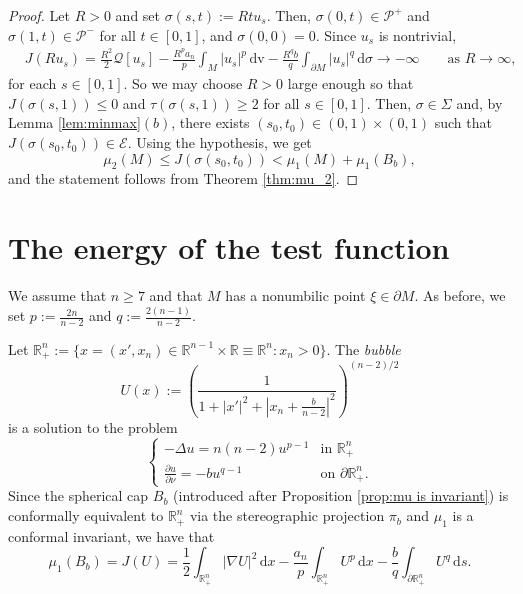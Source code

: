 \documentclass[reqno,11pt,oneside]{amsart}
\numberwithin{equation}{section}
\def\r{\mathbb{R}}
\def\rn{\mathbb{R}^n}
\def\im{\int_{M}}
\def\idm{\int_{\partial M}}
\def\cE{\mathcal{E}}
\def\cP{\mathcal{P}}
\def\d{\,\mathrm{d}}
\def\dv{\,\mathrm{dv}}
\begin{document}
\begin{proof}
Let $R>0$ and set $\sigma(s,t):=Rtu_s$. Then, $\sigma(0,t)\in\cP^+$ and $\sigma(1,t)\in\cP^-$ for all $t\in[0,1]$, and $\sigma(0,0)=0$. Since $u_s$ is nontrivial,
\begin{align*}
&J(Ru_s)=\frac{R^2}{2}\mathscr{Q}[u_s]-\frac{R^pa_n}{p}\im|u_s|^p\dv-\frac{R^qb}{q}\idm|u_s|^q\d \sigma\to-\infty\qquad\text{as \ }R\to\infty,
\end{align*}
for each $s\in[0,1]$. So we may choose $R>0$ large enough so that $J(\sigma(s,1))\leq 0$ and $\tau(\sigma(s,1))\geq 2$ for all $s\in[0,1]$. Then, $\sigma\in\Sigma$ and, by Lemma \ref{lem:minmax}$(b)$, there exists $(s_0,t_0)\in(0,1)\times(0,1)$ such that $J(\sigma(s_0,t_0))\in\cE$. Using the hypothesis, we get
$$\mu_2(M)\leq J(\sigma(s_0,t_0))< \mu_1(M)+\mu_1(B_b),$$
and the statement follows from Theorem \ref{thm:mu_2}.
\end{proof}



\section{The energy of the test function}
\label{sec:test function}

We assume that $n\geq 7$ and that $M$ has a nonumbilic point $\xi\in\partial M$. As before, we set $p:=\frac{2n}{n-2}$ and $q:=\frac{2(n-1)}{n-2}$.

Let $\rn_+:=\{x=(x',x_n)\in\r^{n-1}\times\r\equiv\rn:x_n>0\}$. The \emph{bubble} 
$$U(x):=\left(\frac{1}{1+|x'|^2+|x_n+\frac{b}{n-2}|^2}\right)^{(n-2)/2}$$
is a solution to the problem
\begin{equation*}
\begin{cases}
-\Delta u = n(n-2)u^{p-1}&\text{in \ }\rn_+ \\
\frac{\partial u}{\partial\nu}=-bu^{q-1} &\text{on \ }\partial\rn_+.
\end{cases}
\end{equation*}
Since the spherical cap $B_b$ (introduced after Proposition \ref{prop:mu is invariant}) is conformally equivalent to $\rn_+$ via the stereographic projection $\pi_b$ and $\mu_1$ is a conformal invariant, we have that
$$\mu_1(B_b)=J(U)=\frac{1}{2}\int_{\rn_+}|\nabla U|^2\d x -\frac{a_n}{p}\int_{\rn_+}U^p\d x-\frac{b}{q}\int_{\partial\rn_+}U^q\d s.$$
\end{document}
